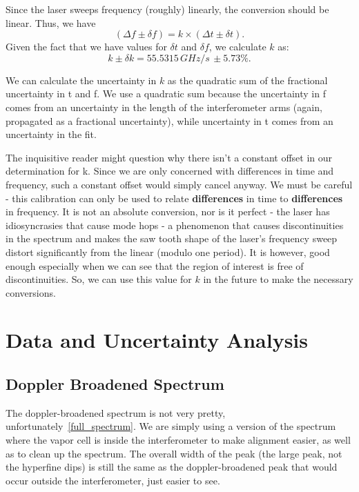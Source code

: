 \documentclass{article}
\begin{document}
  \hspace{.25cm}

  Since the laser sweeps frequency (roughly) linearly, the conversion should be linear.  Thus, we have
  \begin{equation*}
    (\Delta f \pm \delta f) = k \times (\Delta t \pm \delta t).
  \end{equation*}
  Given the fact that we have values for $\delta t$ and $\delta f$, we calculate $k$ as:
  \begin{equation}
    k \pm \delta k = 55.5315 \, G\!H\!z/s \, \pm 5.73\%.
    \label{k}
  \end{equation}

  We can calculate the uncertainty in $k$ as the quadratic sum of the fractional uncertainty in t and f.  We use a quadratic sum because the uncertainty in f comes from an uncertainty in the length of the interferometer arms (again, propagated as a fractional uncertainty), while uncertainty in t comes from an uncertainty in the fit.

  \hspace{.25cm}

  The inquisitive reader might question why there isn't a constant offset in our determination for k.  Since we are only concerned with differences in time and frequency, such a constant offset would simply cancel anyway.  We must be careful - this calibration can only be used to relate \textbf{differences} in time to \textbf{differences} in frequency.  It is not an absolute conversion, nor is it perfect - the laser has idiosyncrasies that cause mode hops - a phenomenon that causes discontinuities in the spectrum and makes the saw tooth shape of the laser's frequency sweep distort significantly from the linear (modulo one period).  It is however, good enough especially when we can see that the region of interest is free of discontinuities.  So, we can use this value for $k$ in the future to make the necessary conversions.

\section{Data and Uncertainty Analysis}
  \subsection{Doppler Broadened Spectrum}
  The doppler-broadened spectrum is not very pretty, unfortunately~\ref{full_spectrum}.  We are simply using a version of the spectrum where the vapor cell is inside the interferometer to make alignment easier, as well as to clean up the spectrum.  The overall width of the peak (the large peak, not the hyperfine dips) is still the same as the doppler-broadened peak that would occur outside the interferometer, just easier to see.
\end{document}
